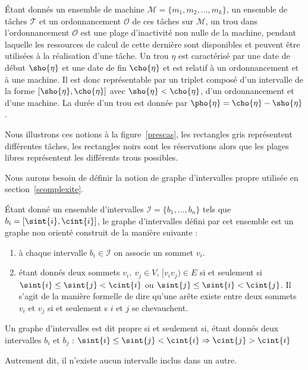\documentclass[a4paper,9pt]{report}
\begin{document}
\begin{ndf}[Trou]
    Étant donnés un ensemble de machine $\mathcal{M} = \{m_1, m_2, \dots, m_k\}$, un ensemble de
    tâches $\mathcal{T}$ et un ordonnancement $\mathcal{O}$ de ces tâches sur $\mathcal{M}$, un trou
    dans l'ordonnancement $\mathcal{O}$ est une plage d'inactivité non nulle de la machine, pendant
    laquelle les ressources de calcul de cette dernière sont disponibles et peuvent être utilisées à
    la réalisation d'une tâche. Un trou $\eta$ est caractérisé par une date de début $\sho{\eta}$ et
    une date de fin $\cho{\eta}$ et est relatif à un ordonnancement et à une machine. Il est donc
    représentable par un triplet composé d'un intervalle de la forme $[\sho{\eta}, \cho{\eta}]$ avec
    $\sho{\eta} < \cho{\eta}$, d'un ordonnancement et d'une machine. La durée d'un trou est donnée
    par $\pho{\eta} = \cho{\eta} - \sho{\eta}$.
\end{ndf}

Nous illustrons ces notions à la figure~\ref{prescas}, les rectangles gris
représentent différentes tâches, les rectangles noirs sont les réservations alors que les plages
libres représentent les différents trous possibles.

Nous aurons besoin de définir la notion de graphe d'intervalles propre utilisée en
section~\ref{scomplexite}.

\begin{ndf}
    Étant donné un ensemble d'intervalles $\mathcal{I} = \{b_1, \dots, b_n\}$ tels que $b_i = [\sint{i},
    \cint{i}]$, le graphe d'intervalles défini par cet ensemble est un graphe non orienté construit de la
    manière suivante :
    \begin{enumerate}
        \item à chaque intervalle $b_i \in \mathcal{I}$ on associe un sommet $v_i$.
        \item étant donnés deux sommets $v_i,\ v_j \in V$, $[v_iv_j) \in E$ si et seulement si 
            $\sint{i} \leq \sint{j} < \cint{i}$ ou $\sint{j} \leq \sint{i} < \cint{j}$. Il s'agit
            de la manière formelle de dire qu'une arête existe entre deux sommets $v_i$ et $v_j$ si
            et seulement s $i$ et $j$ se chevauchent.
    \end{enumerate}

    Un graphe d'intervalles est dit propre si et seulement si, étant donnés deux intervalles $b_i$
    et $b_j$ : $\sint{i} \leq \sint{j} < \cint{i} \Rightarrow \cint{j} > \cint{i}$

    Autrement dit, il n'existe aucun intervalle inclus dans un autre.
\end{ndf}
\end{document}
